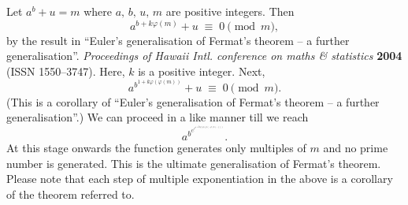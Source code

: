 \documentclass[12pt]{article}
\begin{document}
        
Let $a^b+u = m$ where $a,\,b,\,u,\,m$ are positive integers.  Then\,  
$$ a^{b+k\varphi(m)}+u  \;\equiv\; 0 \pmod m, $$
by the result in ``Euler's  generalisation of Fermat's theorem -- a further generalisation''. {\it Proceedings of Hawaii  Intl. conference on maths \& statistics} \textbf{2004} (ISSN 1550--3747).  Here, $k$ is a positive integer.  Next,  
$$ a^{b^{1+k\varphi(\varphi(m))}}+u \;\equiv\; 0 \pmod m. $$
(This is a corollary of ``Euler's generalisation of Fermat's theorem -- a further generalisation''.)
We can proceed in a like manner till we reach
$$ a^{b^{c^{\vdots^{t^{1+k\varphi(\varphi(\varphi(\ldots \varphi(2)\ldots)))}}}}}. $$ 
At this stage onwards the function generates only multiples of $m$ and no prime number is generated.  This is the ultimate generalisation of Fermat's theorem.  Please note that each step of multiple exponentiation in the above is a corollary  of the theorem referred to.


\end{document}
